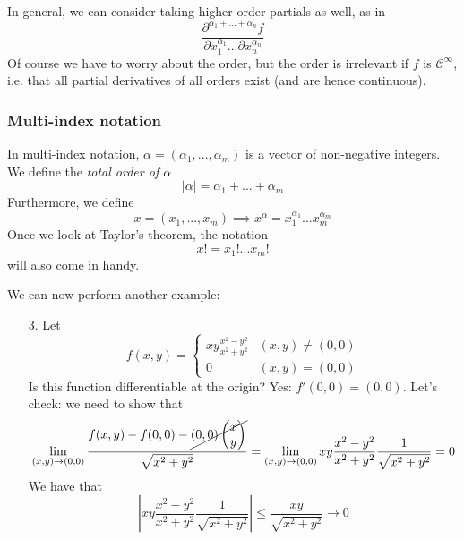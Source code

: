 \documentclass{article}
\newcommand{\mc}[1]{\mathcal{#1}}
\begin{document}
In general, we can consider taking higher order partials as well, as in
\begin{equation}\frac{\partial^{\alpha_1 + ... + \alpha_n}f}{\partial x_1^{\alpha_1} ... \partial x_n^{\alpha_n}}\end{equation}
Of course we have to worry about the order, but the order is irrelevant if \(f\) is \(\mc{C}^\infty\), i.e. that all partial derivatives of all orders exist (and are hence continuous).

\subsubsection{Multi-index notation}
In multi-index notation, \(\alpha = (\alpha_1,...,\alpha_m)\) is a vector of non-negative integers. We define the \textit{total order of \(\alpha\)}
\begin{equation}|\alpha| = \alpha_1 + ... + \alpha_m\end{equation}
Furthermore, we define
\begin{equation}x = (x_1,...,x_m) \implies x^\alpha = x_1^{\alpha_1}...x_m^{\alpha_m}\end{equation}
Once we look at Taylor's theorem, the notation
\begin{equation}x! = x_1!...x_m!\end{equation}
will also come in handy.

We can now perform another example:
\begin{itemize}

  \item [3.] Let
  \begin{equation}f(x, y) = \left\{\begin{array}{cc}
    xy\frac{x^2 - y^2}{x^2 + y^2} & (x, y) \neq (0, 0) \\
    0 & (x, y) = (0, 0)
  \end{array}\right.\end{equation}
  Is this function differentiable at the origin? Yes: \(f'(0, 0) = (0, 0)\). Let's check: we need to show that
  \begin{equation}\lim_{(x, y) \to (0, 0)}\frac{f(x, y) - f(0, 0) - \cancel{(0, 0)\begin{pmatrix} x \\ y \end{pmatrix}}}{\sqrt{x^2 + y^2}} = \lim_{(x, y) \to (0, 0)}xy\frac{x^2 - y^2}{x^2 + y^2}\frac{1}{\sqrt{x^2 + y^2}} = 0\end{equation}
  We have that
  \begin{equation}\left|xy\frac{x^2 - y^2}{x^2 + y^2}\frac{1}{\sqrt{x^2 + y^2}}\right| \leq \frac{|xy|}{\sqrt{x^2 + y^2}} \to 0\end{equation}

\end{itemize}
\end{document}
